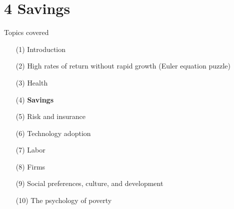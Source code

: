 \documentclass[aspectratio=169, 10pt, handout]{beamer}
\begin{document}
\section{4 Savings}

\begin{frame}{Topics covered}

\small 

\begin{enumerate}[(1)]

	\item[(1)] Introduction 
	
	\item[(2)] {High rates of return without rapid growth (Euler equation puzzle)}

	\item[(3)] {Health}
	
	\item[(4)] \textbf{Savings}
		
	\item[(5)] Risk and insurance

	\item[(6)] Technology adoption
	
	\item[(7)] Labor

	\item[(8)] Firms
	
	\item[(9)] Social preferences, culture, and development
	
	\item[(10)] The psychology of poverty

\end{enumerate}

\end{frame}
\end{document}
